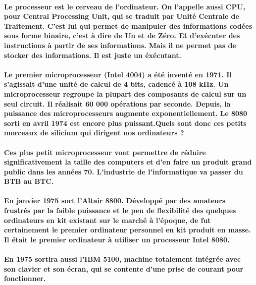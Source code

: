 \paragraph{
  Le processeur est le cerveau de l'ordinateur. On l'appelle aussi CPU, pour Central Processing Unit, qui se traduit par Unité Centrale de Traitement. C'est lui qui permet de manipuler des informations codées sous forme binaire, c'est à dire de Un et de Zéro. Et d'exécuter des instructions à partir de ses informations. Mais il ne permet pas de stocker des informations. Il est juste un éxécutant.
}

\paragraph{
  Le premier microprocesseur (Intel 4004) a été inventé en 1971. Il s'agissait d'une unité de calcul de 4 bits, cadencé à 108 kHz. Un microprocesseur regroupe la plupart des composants de calcul sur un seul circuit. Il réalisait 60 000 opérations par seconde. Depuis, la puissance des microprocesseurs augmente exponentiellement. Le 8080 sorti en avril 1974 est encore plus puissant.Quels sont donc ces petits morceaux de silicium qui dirigent nos ordinateurs ?
}

\paragraph{
  Ces plus petit microprocesseur vont permettre de réduire significativement la taille des computers et d'en faire un produit grand public dans les années 70. L'industrie de l'informatique va passer du BTB au BTC.
}

\paragraph{
  En janvier 1975 sort l'Altair 8800. Développé par des amateurs frustrés par la faible puissance et le peu de flexibilité des quelques ordinateurs en kit existant sur le marché à l'époque, de fut certainement le premier ordinateur personnel en kit produit en masse. Il était le premier ordinateur à utiliser un processeur Intel 8080.
}

\paragraph{
  En 1975 sortira aussi l'IBM 5100, machine totalement intégrée avec son clavier et son écran, qui se contente d'une prise de courant pour fonctionner.
}

